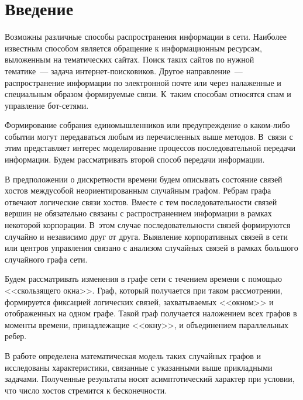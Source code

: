       \begin{multicols}{2}

            \label{st\stat}

\section{Введение}

     Возможны различные способы распространения информации в сети. Наиболее 
известным способом является обращение к информационным ресурсам, выложенным на 
тематических сайтах. Поиск таких сайтов по нужной тематике~--- задача 
     ин\-тер\-нет-по\-иско\-ви\-ков. Другое направление~---\linebreak распространение информации 
по электронной поч\-те или через налаженные и специальным образом формируемые связи. 
К~таким способам относятся спам и управление бот-се\-тями. 
     
     Формирование собрания единомышленников или предупреждение о каком-либо 
событии могут передаваться любым из перечисленных выше методов. В~связи с этим 
представляет интерес моделирование процессов последовательной передачи информации. 
Будем рассматривать второй способ передачи информации. 
     
     В предположении о дискретности времени будем описывать состояние связей хостов 
между\linebreak собой неориентированным случайным графом. Реб\-рам графа отвечают логические 
связи хостов. Вмес\-те с тем последовательности связей вершин не обязательно связаны с 
распространением инфор\-мации в рамках некоторой корпорации. В~этом \mbox{случае} 
последовательности связей формируются случайно и независимо друг от друга. 
Выявление корпоратив\-ных связей в сети или центров управления связано с анализом 
случайных связей в рамках большого случайного графа сети. 
     
     Будем рассматривать изменения в графе сети с течением времени с помощью 
<<скользящего окна>>. Граф, который получается при таком рассмотрении, формируется 
фиксацией логических связей, захватываемых <<окном>> и отображенных на одном 
графе. Такой граф получается наложением всех графов в моменты времени, 
принадлежащие <<окну>>, и объединением параллельных ребер.
     
     В работе определена математическая модель таких случайных графов и исследованы 
характеристики, связанные с указанными выше прикладными задачами. Полученные 
результаты носят асимптотический характер при условии, что число хостов стремится к 
бесконечности. 
     

\end{multicols}
